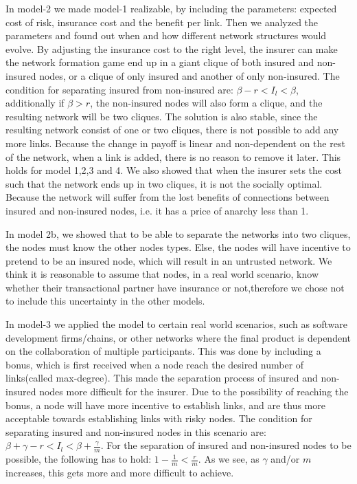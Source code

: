 In model-2 we made model-1 realizable, by including the parameters: expected cost of risk, insurance cost and the benefit per link. Then we analyzed the parameters and found out when and how different network structures would evolve. By adjusting the insurance cost to the right level, the insurer can make the network formation game end up in a giant clique of both insured and non-insured nodes, or a clique of only insured and another of only non-insured. The condition for separating insured from non-insured are: $\beta-r<I_{l}<\beta$, additionally if $\beta>r$, the non-insured nodes will also form a clique, and the resulting network will be two cliques. The solution is also stable, since the resulting network consist of one or two cliques, there is not possible to add any more links. Because the change in payoff is linear and non-dependent on the rest of the network, when a link is added, there is no reason to remove it later. This holds for model 1,2,3 and 4.
We also showed that when the insurer sets the cost such that the network ends up in two cliques, it is not the socially optimal. Because the network will suffer from the lost benefits of connections between insured and non-insured nodes, i.e. it has a price of anarchy less than 1.


In model 2b, we showed that to be able to separate the networks into two cliques, the nodes must know the other nodes types. Else, the nodes will have incentive to pretend to be an insured node, which will result in an untrusted network. We think it is reasonable to assume that nodes, in a real world scenario, know whether their transactional partner have insurance or not,therefore we chose not to include this uncertainty in the other models.

In model-3 we applied the model to certain real world scenarios, such as software development firms/chains, or other networks where the final product is dependent on the collaboration of multiple participants.
This was done by including a bonus, which is first received when a node reach the desired number of links(called max-degree). This made the separation process of insured and non-insured nodes more difficult for the insurer. Due to the possibility of reaching the bonus, a node will have more incentive to establish links, and are thus more acceptable towards establishing links with risky nodes. The condition for separating insured and non-insured nodes in this scenario are: $\beta+\gamma-r<I_{l}<\beta+\frac{\gamma}{m}$. For the separation of insured and non-insured nodes to be possible, the following has to hold: $1-\frac{1}{m}<\frac{r}{m}$. As we see, as $\gamma$ and/or $m$ increases, this gets more and more difficult to achieve. 

